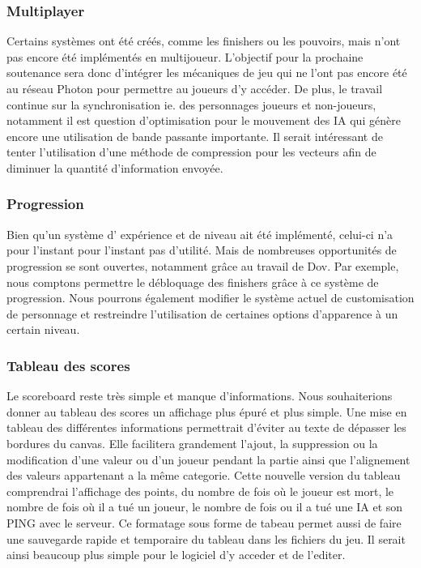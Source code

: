 	\subsubsection{Multiplayer}
	Certains systèmes ont été créés, comme les finishers ou les pouvoirs, mais n'ont pas encore été 
	implémentés en multijoueur. L'objectif pour la prochaine soutenance sera donc d'intégrer les mécaniques 
	de jeu qui ne l'ont pas encore été au réseau Photon pour permettre au joueurs d'y accéder. De plus, le 
	travail continue sur la synchronisation ie. des personnages joueurs et non-joueurs, notamment il est 
	question d'optimisation pour le mouvement des IA qui génère encore une utilisation de bande passante importante. 
	Il serait intéressant de tenter l'utilisation d'une méthode de compression pour les vecteurs afin de diminuer 
	la quantité d'information envoyée.

	\subsubsection{Progression}
		Bien qu'un système d' expérience et de niveau ait été implémenté, celui-ci n'a pour l'instant pour 
		l'instant pas d'utilité. Mais de nombreuses opportunités de progression se sont ouvertes, 
		notamment grâce au travail de Dov. Par exemple, nous comptons permettre le débloquage des 
		finishers grâce à ce système de progression. Nous pourrons également modifier le système actuel 
		de customisation de personnage et restreindre l'utilisation de certaines options d'apparence à un certain niveau.

    \subsubsection{Tableau des scores}
    Le scoreboard reste très simple et manque d’informations. Nous souhaiterions donner au tableau des scores un affichage plus épuré et plus simple. Une mise en tableau des différentes informations permettrait d’éviter au texte de dépasser les bordures du canvas. Elle facilitera grandement l’ajout, la suppression ou la modification d’une valeur ou d’un joueur pendant la partie ainsi que l’alignement des valeurs appartenant a la même categorie. 
    Cette nouvelle version du tableau comprendrai l'affichage des points, du nombre de fois où le joueur est mort, le nombre de fois où il a tué un joueur, le nombre de fois ou il a tué une IA et son PING avec le serveur.
    Ce formatage sous forme de tabeau permet aussi de faire une sauvegarde rapide et temporaire du tableau dans les fichiers du jeu. Il serait ainsi beaucoup plus simple pour le logiciel d'y acceder et de l'editer.
    
